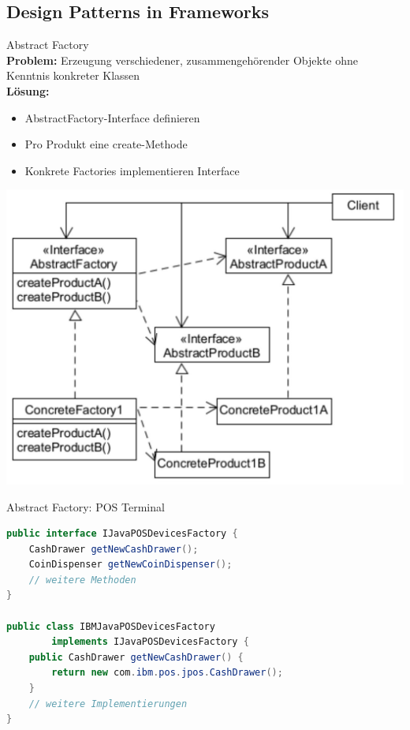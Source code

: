 \subsection{Design Patterns in Frameworks}

\begin{concept}{Abstract Factory}\\
\textbf{Problem:} Erzeugung verschiedener, zusammengehörender Objekte ohne Kenntnis konkreter Klassen\\
\textbf{Lösung:}
\begin{itemize}
    \item AbstractFactory-Interface definieren
    \item Pro Produkt eine create-Methode
    \item Konkrete Factories implementieren Interface
\end{itemize}
\includegraphics[width=0.8\linewidth]{images/2025_01_02_73d93f10fa91ab6123dcg-13}
\end{concept}

\begin{example}{Abstract Factory: POS Terminal}
\begin{lstlisting}[language=Java, style=base]
public interface IJavaPOSDevicesFactory {
    CashDrawer getNewCashDrawer();
    CoinDispenser getNewCoinDispenser();
    // weitere Methoden
}

public class IBMJavaPOSDevicesFactory 
        implements IJavaPOSDevicesFactory {
    public CashDrawer getNewCashDrawer() {
        return new com.ibm.pos.jpos.CashDrawer();
    }
    // weitere Implementierungen
}
\end{lstlisting}
\end{example}

